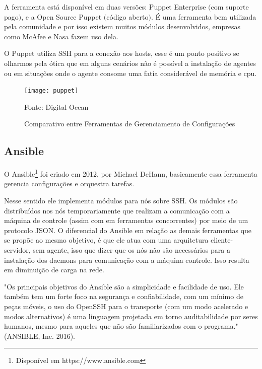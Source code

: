 A ferramenta está disponível em duas versões: Puppet Enterprise $($com suporte pago$)$, e a Open Source Puppet $($código aberto$)$. É uma ferramenta bem utilizada pela comunidade e por isso existem muitos módulos desenvolvidos, empresas como McAfee e Nasa fazem uso dela.

O Puppet utiliza SSH para a conexão aos hosts, esse é um ponto positivo se olharmos pela ótica que em alguns cenários não é possível a instalação de agentes ou em situações onde o agente consome uma fatia considerável de memória e cpu.



\begin{figure} [htb]
	\centering
	\texttt{[image: puppet]}
	\caption{Comparativo entre Ferramentas de Gerenciamento de Configurações}
	Fonte: Digital Ocean
	\label{fig:puppet}
\end{figure}


\subsection{Ansible}

O Ansible\footnote{Disponível em https://www.ansible.com} foi criado em 2012, por Michael DeHann, basicamente essa ferramenta gerencia configurações e orquestra tarefas. 

Nesse sentido ele implementa módulos para nós sobre SSH. Os módulos são distribuídos nos nós temporariamente que realizam a comunicação com a máquina de controle (assim com em ferramentas concorrentes) por meio de um protocolo JSON.
O diferencial do Ansible em relação as demais ferramentas que se propõe ao mesmo objetivo, é que ele atua com uma arquitetura cliente-servidor, sem agente,  isso que dizer que os nós não são necessários para a instalação dos daemons para comunicação com a máquina controle. Isso resulta em diminuição de carga na rede. 

			\begin{flushright}
				\begin{minipage}{0.75\textwidth}
					\normalsize "Os principais objetivos do Ansible são a simplicidade e facilidade de uso. Ele também tem um forte foco na segurança e confiabilidade, com um mínimo de peças móveis, o uso do OpenSSH para o transporte (com um modo acelerado e modos alternativos) é uma linguagem projetada em torno auditabilidade por seres humanos, mesmo para aqueles que não são familiarizados com o programa." (ANSIBLE, Inc. 2016). 
				\end{minipage}
			\end{flushright}

